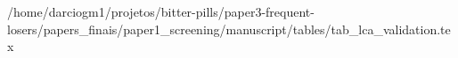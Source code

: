 /home/darciogm1/projetos/bitter-pills/paper3-frequent-losers/papers_finais/paper1_screening/manuscript/tables/tab_lca_validation.tex